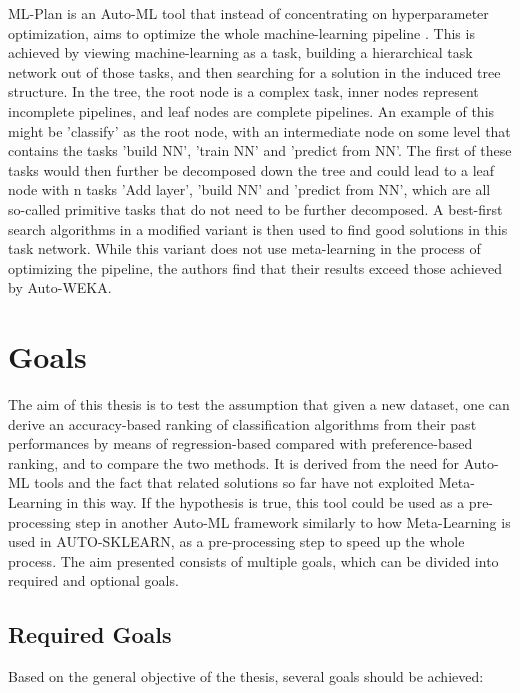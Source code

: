 \documentclass[12pt]{scrartcl}
\begin{document}
ML-Plan is an Auto-ML tool that instead of concentrating on hyperparameter optimization, aims to optimize the whole machine-learning pipeline \cite{wever2017automatic}. This is achieved by viewing machine-learning as a task, building a hierarchical task network out of those tasks, and then searching for a solution in the induced tree structure. In the tree, the root node is a complex task, inner nodes represent incomplete pipelines, and leaf nodes are complete pipelines. An example of this might be 'classify' as the root node, with an intermediate node on some level that contains the tasks 'build NN', 'train NN' and 'predict from NN'. The first of these tasks would then further be decomposed down the tree and could lead to a leaf node with n tasks 'Add layer', 'build NN' and 'predict from NN', which are all so-called primitive tasks that do not need to be further decomposed. A best-first search algorithms in a modified variant is then used to find good solutions in this task network. While this variant does not use meta-learning in the process of optimizing the pipeline, the authors find that their results exceed those achieved by Auto-WEKA.\\

\section{Goals}\label{sec:goals}
The aim of this thesis is to test the assumption that given a new dataset, one can derive an accuracy-based ranking of classification algorithms from their past performances by means of regression-based compared with preference-based ranking, and to compare the two methods. It is derived from the need for Auto-ML tools and the fact that related solutions so far have not exploited Meta-Learning in this way. If the hypothesis is true, this tool could be used as a pre-processing step in another Auto-ML framework similarly to how Meta-Learning is used in AUTO-SKLEARN, as a pre-processing step to speed up the whole process. The aim presented consists of multiple goals, which can be divided into required and optional goals.

\newpage
\subsection{Required Goals}\label{subsec:required_goals}
Based on the general objective of the thesis, several goals should be achieved:
\end{document}
